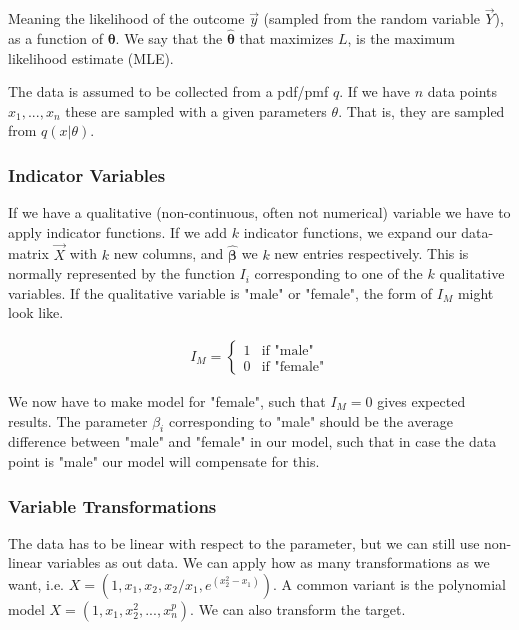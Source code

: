 \documentclass{article}
\newcommand{\vecsym}[1]{\boldsymbol{#1}} %
\newcommand{\uvec}[1]{\mathbf{\hat{#1}}}
\begin{document}
Meaning the likelihood of the outcome $\Vec{y}$ (sampled from the random variable $\Vec{Y}$), as a function of $\vecsym{\theta}$. We say that the $\uvec{\theta}$ that maximizes $L$, is the maximum likelihood estimate (MLE). 

The data is assumed to be collected from a pdf/pmf $q$. If we have $n$ data points $x_1, ... , x_n$ these are sampled with a given parameters $\theta$. That is, they are sampled from $q(x|\theta)$.
 
\subsubsection{Indicator Variables}
If we have a qualitative (non-continuous, often not numerical) variable we have to apply indicator functions. If we add $k$ indicator functions, we expand our data-matrix $\Vec{X}$ with $k$ new columns, and $\uvec{\beta}$ we $k$ new entries respectively. This is normally represented by the function $I_i$ corresponding to one of the $k$ qualitative variables. If the qualitative variable is "male" or "female", the form of $I_M$ might look like. 

\begin{align*}
I_M = 
\left\{
	\begin{array}{ll}
		1  & \mbox{if } \text{"male"} \\
		0 & \mbox{if } \text{"female"}
	\end{array}
\right.
\end{align*}

We now have to make model for "female", such that $I_M = 0$ gives expected results. The parameter $\beta_i$ corresponding to "male" should be the average difference between "male" and "female" in our model, such that in case the data point is "male" our model will compensate for this. 

\subsubsection{Variable Transformations}
The data has to be linear with respect to the parameter, but we can still use non-linear variables as out data. We can apply how as many transformations as we want, i.e. $X = (1, x_1, x_2, x_2/x_1, e^{(x_2^2 - x_1)})$. A common variant is the polynomial model $X = (1, x_1, x_2^2 , ... , x_n^p)$. We can also transform the target.
\end{document}
